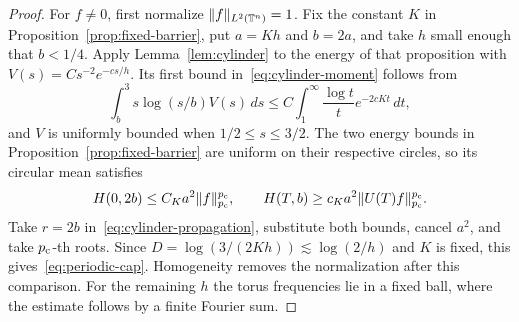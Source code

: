 \begin{proof}
For $f\ne0$, first normalize $\|f\|_{L^2(\mathbb T^n)}=1$.
Fix the constant $K$ in Proposition~\ref{prop:fixed-barrier}, put
$a=Kh$ and $b=2a$, and take $h$ small enough that $b<1/4$. Apply
Lemma~\ref{lem:cylinder} to the energy of that proposition with
$V(s)=Cs^{-2}e^{-cs/h}$. Its first bound in~\eqref{eq:cylinder-moment}
follows from
\[
 \int_b^3 s\log(s/b)V(s)\,ds
 \le C\int_1^\infty \frac{\log t}{t}e^{-2cKt}\,dt ,
\]
and $V$ is uniformly bounded when $1/2\le s\le3/2$. The two energy
bounds in Proposition~\ref{prop:fixed-barrier} are uniform on their
respective circles, so its circular mean satisfies
\[
 H(0,2b)\le C_K a^2\|f\|_{p_{\mathrm c}}^{p_{\mathrm c}},\qquad
 H(T,b)\ge c_K a^2\|U(T)f\|_{p_{\mathrm c}}^{p_{\mathrm c}}.
\]
Take $r=2b$ in~\eqref{eq:cylinder-propagation}, substitute both bounds, cancel
$a^2$, and take $p_{\mathrm c}$-th roots. Since $D=\log(3/(2Kh))\lesssim
\log(2/h)$ and $K$ is fixed, this gives~\eqref{eq:periodic-cap}.
Homogeneity removes the normalization after this comparison. For the
remaining $h$ the torus frequencies lie in a fixed ball, where the
estimate follows by a finite Fourier sum.
\end{proof}
